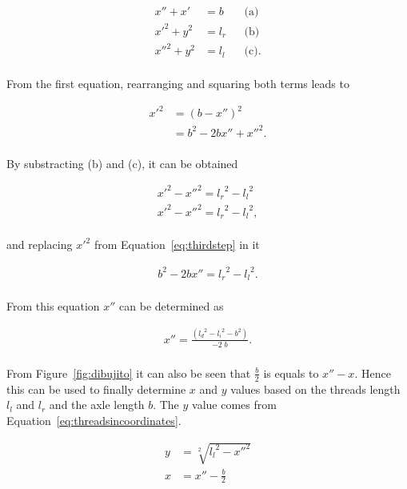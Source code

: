 \documentclass[journal]{IEEEtran}
\begin{document}
\begin{align*}
{x''} + x'					&=  b &&\text{(a)}  \\
{x'}^2 +  y^2                &= l_r &&\text{(b)} \\
{x''}^2 + y^2                &= l_l  &&\text{(c)}. \\
\end{align*}

From the first equation, rearranging and squaring both terms leads to

\begin{equation}
\begin{array}{ll}  
{x'}^2   	&=  ( b - x'')^2   \\
 						&= b^2 - 2 b x''+ {x''}^2. \\
\end{array}
\label{eq:thirdstep}
\end{equation}


By substracting (b) and (c), it can be obtained

\begin{align*}
{x'}^2 - {x'' }^2 = {l_r}^2 - {l_l}^2 \\
{x'}^2 - {x'' }^2 = {l_r}^2 - {l_l}^2, \\
\end{align*}

and replacing ${x'}^2$ from Equation~\ref{eq:thirdstep} in it

\begin{align*}
b^2 - 2 b {x''}= {l_r}^2 - {l_l}^2. \\
\end{align*}


From this equation $x''$ can be determined as

\begin{align*}
x'' = \frac{({l_d}^2 - {l_i}^2 - b^2)}{-2 \; b}.    \\
\end{align*}

From Figure~\ref{fig:dibujito} it can also be seen that $\frac{b}{2}$ is equals to $x'' - x$.  Hence this can be used to finally determine $x$ and $y$ values based on the threads length $l_l$ and $l_r$ and the axle length $b$.  The $y$ value comes from Equation~\ref{eq:threadsincoordinates}.

\begin{align*}
y &= \sqrt[2]{{l_l}^2 - {x''}^2 } \\
x &= x'' - \frac{b}{2}\\
\end{align*}
\end{document}
